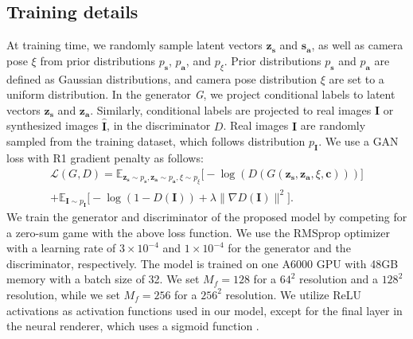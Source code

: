 \documentclass[nohyperref]{article}
\theoremstyle{plain}
\theoremstyle{definition}
\theoremstyle{remark}
\begin{document}
\subsection{Training details}
At training time, we randomly sample latent vectors $\textbf{z}_\textbf{s}$ and $\textbf{s}_\textbf{a}$, as well as camera pose $\xi$ from prior distributions $p_{\textbf{s}}$, $p_{\textbf{a}}$, and $p_{\xi}$. Prior distributions $p_{\textbf{s}}$ and $p_{\textbf{a}}$ are defined as Gaussian distributions, and camera pose distribution $\xi$ are set to a uniform distribution. In the generator \textit{G}, we project conditional labels to latent vectors \cite{cgan_proj} $\textbf{z}_{\textbf{s}}$ and $\textbf{z}_{\textbf{a}}$. Similarly, conditional labels are projected to real images $\textbf{I}$ or synthesized images $\hat{\textbf{I}}$, in the discriminator $\textit{D}$. Real images $\textbf{I}$ are randomly sampled from the training dataset, which follows distribution $p_{\textbf{I}}$. We use a GAN loss with R1 gradient penalty \cite{mescheder2018training} as follows:
\begin{align}
    \mathcal{L}(\textit{G}, \textit{D}) = \mathbb{E}_{\textbf{z}_{\textbf{s}}\sim p_{\textbf{s}}, \textbf{z}_{\textbf{a}}\sim p_{\textbf{a}}, \xi\sim p_{\xi}}\big[
    -\log(\textit{D}(\textit{G}(\textbf{z}_{\textbf{s}},\textbf{z}_{\textbf{a}},\xi,\textbf{c})))\big]\\\nonumber + \mathbb{E}_{\textbf{I}\sim p_{\textbf{I}}}
    \big[-\log(1-\textit{D}(\textbf{I})) + \lambda \|\nabla \textit{D}(\textbf{I})\|^{2}\big].
\end{align}
We train the generator and discriminator of the proposed model by competing for a zero-sum game with the above loss function. We use the RMSprop optimizer \cite{rmsprop} with a learning rate of $3\times 10^{-4}$ and $1\times 10^{-4}$ for the generator and the discriminator, respectively. The model is trained on one A6000 GPU with 48GB memory with a batch size of 32. We set $M_{f} = 128$ for a $64^{2}$ resolution and a $128^{2}$ resolution, while we set $M_{f} = 256$ for a $256^{2}$ resolution. We utilize ReLU activations \cite{relu} as activation functions used in our model, except for the final layer in the neural renderer, which uses a sigmoid function \cite{ramachandran2017searching}.
\end{document}
